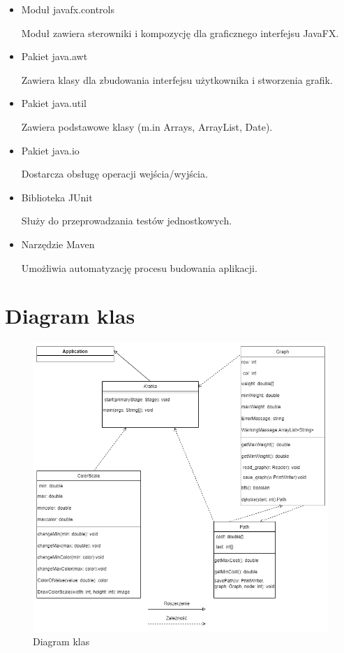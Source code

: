 \documentclass[]{article}
\begin{document}
\begin{itemize}
    \item Moduł javafx.controls
    
    Moduł zawiera sterowniki i kompozycję dla graficznego interfejsu JavaFX. 
    \item Pakiet java.awt
   
    Zawiera klasy dla zbudowania interfejsu użytkownika i stworzenia grafik.
    \item Pakiet java.util
   
    Zawiera podstawowe klasy (m.in Arrays, ArrayList, Date).
    \item Pakiet java.io
   
    Dostarcza obsługę operacji wejścia/wyjścia.
    \item Biblioteka JUnit 
    
    Służy do przeprowadzania testów jednostkowych.
    \item Narzędzie Maven 
    
    Umożliwia automatyzację procesu budowania aplikacji.
    
    
\end{itemize}

\section{Diagram klas}\label{header-n283}
\begin{figure}[h!]
\begin{center}
  \includegraphics[scale=0.6]{diagram.png}
  \end{center}
  \caption{Diagram klas}
  \label{fig:graf}
\end{figure}
\end{document}
